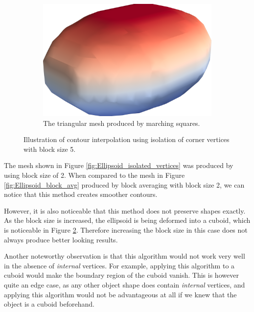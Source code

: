 \documentclass[a4paper,10pt]{report}
\begin{document}
\begin{figure}[H]
    \hfill
    \begin{subfigure}{.32\textwidth}
        \includegraphics[width=\textwidth]{../images/3D/Ellipsoid_marching_squares_isolated_vertices_5.png}
    \caption{The triangular mesh produced by marching squares.}
    \label{fig:Ellipsoid_marching_squares_isolated_vertices_5}
    \end{subfigure}
    \caption{Illustration of contour interpolation using isolation of corner vertices with block size 5.}
    \label{fig:Ellipsoid_isolated_vertices_5}
\end{figure}

The mesh shown in Figure \ref{fig:Ellipsoid_isolated_vertices} was produced by using block size of 2. When compared to the mesh in Figure \ref{fig:Ellipsoid_block_avg} produced by block averaging with block size 2, we can notice that this method creates smoother contours.

However, it is also noticeable that this method does not preserve shapes exactly. As the block size is increased, the ellipsoid is being deformed into a cuboid, which is noticeable in Figure \ref{fig:Ellipsoid_isolated_vertices_5}. Therefore increasing the block size in this case does not always produce better looking results.

Another noteworthy observation is that this algorithm would not work very well in the absence of \textit{internal} vertices. For example, applying this algorithm to a cuboid would make the boundary region of the cuboid vanish. This is however quite an edge case, as any other object shape does contain \textit{internal} vertices, and applying this algorithm would not be advantageous at all if we knew that the object is a cuboid beforehand.
\end{document}
